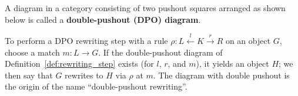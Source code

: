 \begin{definition} 
  \label{def:rewriting_step}
    A diagram in a category consisting of two pushout squares arranged as shown below
    is called a \textbf{double-pushout (DPO) diagram}.
    \begin{center}
    \end{center}
  \end{definition}
To perform a DPO rewriting step with a rule \(\rho: L \xleftarrow{l} K \xrightarrow{r} R\) on an object \(G\), choose a match \(m: L \mathop{\to} G\). 
If the double-pushout diagram of Definition~\ref{def:rewriting_step} exists (for \(l\), \(r\), and \(m\)), it yields an object \(H\); we then say that \(G\) rewrites to \(H\) via \(\rho\) at \(m\). The diagram with double pushout is the origin of the name \enquote{double-pushout rewriting}.

